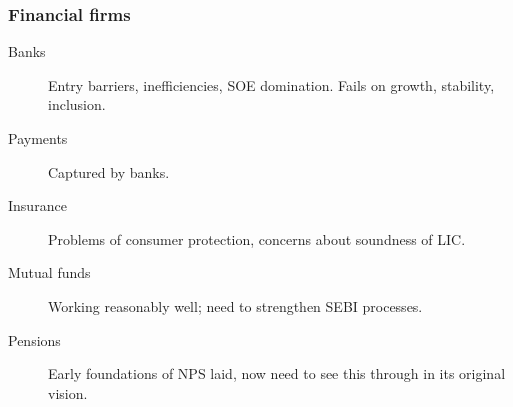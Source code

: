 \documentclass{beamer}
\begin{document}
\begin{frame}
  \frametitle{Financial firms}
  \begin{description}
  \item[Banks] Entry barriers, inefficiencies, SOE domination. Fails
    on growth, stability, inclusion.
  \item[Payments] Captured by banks.
  \item[Insurance] Problems of consumer protection, concerns about
    soundness of LIC.
  \item[Mutual funds] Working reasonably well; need to strengthen SEBI
    processes.
  \item[Pensions] Early foundations of NPS laid, now need to see this
    through in its original vision.
  \end{description}
\end{frame}
\end{document}
